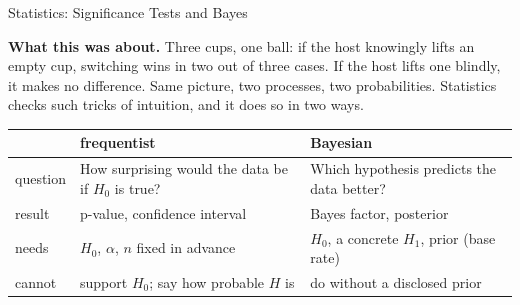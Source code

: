 \begin{handout}{Statistics: Significance Tests and Bayes}

\textbf{What this was about.} Three cups, one ball: if the host
knowingly lifts an empty cup, switching wins in two out of three cases.
If the host lifts one blindly, it makes no difference. Same picture, two
processes, two probabilities. Statistics checks such tricks of intuition,
and it does so in two ways.

\begin{center}
\small
\begin{tabular}{@{}p{}p{}p{}@{}}
\toprule
 & \textbf{frequentist} & \textbf{Bayesian} \\
\midrule
question & How surprising would the data be if $H_0$ is true? & Which hypothesis predicts the data better? \\
result & p-value, confidence interval & Bayes factor, posterior \\
needs & $H_0$, $\alpha$, $n$ fixed in advance & $H_0$, a concrete $H_1$, prior (base rate) \\
cannot & support $H_0$; say how probable $H$ is & do without a disclosed prior \\
\bottomrule
\end{tabular}
\end{center}


\end{handout}
